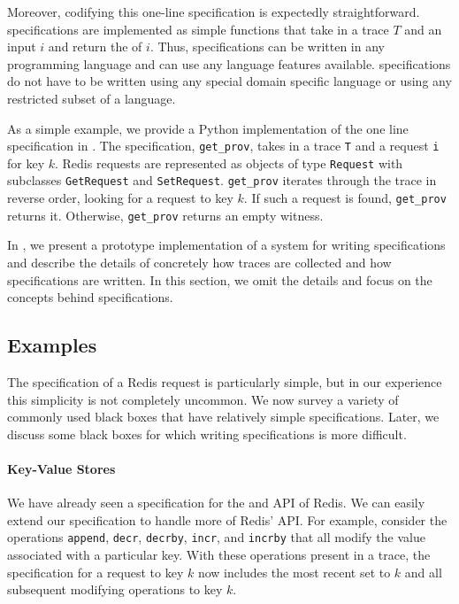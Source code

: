 Moreover, codifying this one-line \watprovenance{} specification is expectedly
straightforward. \Watprovenance{} specifications are implemented as simple
functions that take in a trace $T$ and an input $i$ and return the
\watprovenance{} of $i$. Thus, \watprovenance{} specifications can be written
in any programming language and can use any language features available.
\Watprovenance{} specifications do not have to be written using any special
domain specific language or using any restricted subset of a language.

As a simple example, we provide a Python implementation of the one line
\watprovenance{} specification in .  The specification,
\texttt{get\_prov}, takes in a trace \texttt{T} and a \kvget{} request
\texttt{i} for key $k$. Redis requests are represented as objects of type
\texttt{Request} with subclasses \texttt{GetRequest} and \texttt{SetRequest}.
\texttt{get\_prov} iterates through the trace in reverse order, looking for a
\kvset{} request to key $k$. If such a \kvset{} request is found,
\texttt{get\_prov} returns it. Otherwise, \texttt{get\_prov} returns an empty
witness.

{}

In , we present a prototype implementation of a system for
writing \watprovenance{} specifications and describe the details of concretely
how traces are collected and how \watprovenance{} specifications are written.
In this section, we omit the details and focus on the concepts behind
\watprovenance{} specifications.

\subsection{Examples}
The \watprovenance{} specification of a Redis \kvget{} request is particularly
simple, but in our experience this simplicity is not completely uncommon. We
now survey a variety of commonly used black boxes that have relatively simple
\watprovenance{} specifications. Later, we discuss some black boxes for which
writing \watprovenance{} specifications is more difficult.

\paragraph{Key-Value Stores}
We have already seen a \watprovenance{} specification for the \kvget{} and
\kvset{} API of Redis. We can easily extend our \watprovenance{} specification
to handle more of Redis' API. For example, consider the operations
\texttt{append}, \texttt{decr}, \texttt{decrby}, \texttt{incr}, and
\texttt{incrby} that all modify the value associated with a particular key.
With these operations present in a trace, the \watprovenance{} specification
for a \kvget{} request to key $k$ now includes the most recent set to $k$ and
all subsequent modifying operations to key $k$.

